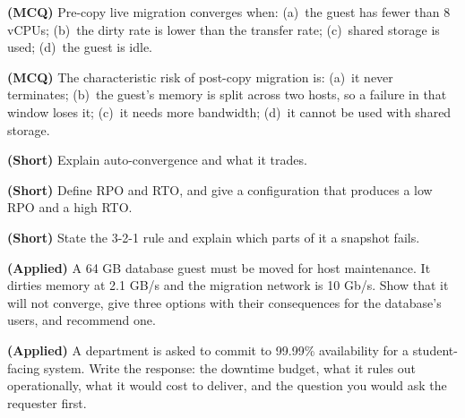 \begin{reviewq}
  \item \textbf{(MCQ)} Pre-copy live migration converges when: (a)~the guest
        has fewer than 8 vCPUs; (b)~the dirty rate is lower than the transfer
        rate; (c)~shared storage is used; (d)~the guest is idle.
  \item \textbf{(MCQ)} The characteristic risk of post-copy migration is:
        (a)~it never terminates; (b)~the guest's memory is split across two
        hosts, so a failure in that window loses it; (c)~it needs more
        bandwidth; (d)~it cannot be used with shared storage.
  \item \textbf{(Short)} Explain auto-convergence and what it trades.
  \item \textbf{(Short)} Define RPO and RTO, and give a configuration that
        produces a low RPO and a high RTO.
  \item \textbf{(Short)} State the 3-2-1 rule and explain which parts of it a
        snapshot fails.
  \item \textbf{(Applied)} A 64 GB database guest must be moved for host
        maintenance. It dirties memory at 2.1 GB/s and the migration network
        is 10 Gb/s. Show that it will not converge, give three options with
        their consequences for the database's users, and recommend one.
  \item \textbf{(Applied)} A department is asked to commit to 99.99\%
        availability for a student-facing system. Write the response: the
        downtime budget, what it rules out operationally, what it would cost to
        deliver, and the question you would ask the requester first.
\end{reviewq}
